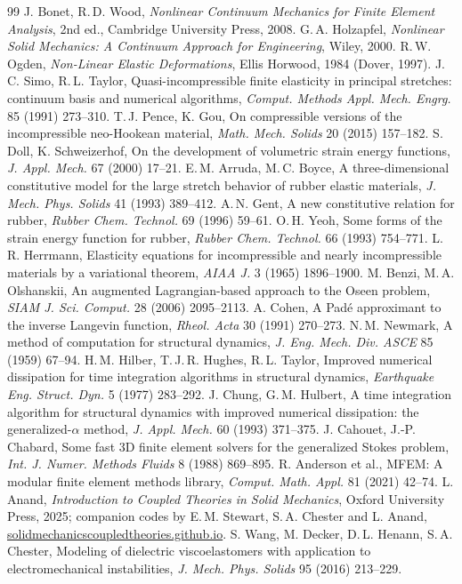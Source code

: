 \documentclass[11pt]{article}
\begin{document}
\small\begin{thebibliography}{99}
 J. Bonet, R.\,D. Wood, \emph{Nonlinear Continuum Mechanics for Finite Element Analysis}, 2nd ed., Cambridge University Press, 2008.
 G.\,A. Holzapfel, \emph{Nonlinear Solid Mechanics: A Continuum Approach for Engineering}, Wiley, 2000.
 R.\,W. Ogden, \emph{Non-Linear Elastic Deformations}, Ellis Horwood, 1984 (Dover, 1997).
 J.\,C. Simo, R.\,L. Taylor, Quasi-incompressible finite elasticity in principal stretches: continuum basis and numerical algorithms, \emph{Comput. Methods Appl. Mech. Engrg.} 85 (1991) 273--310.
 T.\,J. Pence, K. Gou, On compressible versions of the incompressible neo-Hookean material, \emph{Math. Mech. Solids} 20 (2015) 157--182.
 S. Doll, K. Schweizerhof, On the development of volumetric strain energy functions, \emph{J. Appl. Mech.} 67 (2000) 17--21.
 E.\,M. Arruda, M.\,C. Boyce, A three-dimensional constitutive model for the large stretch behavior of rubber elastic materials, \emph{J. Mech. Phys. Solids} 41 (1993) 389--412.
 A.\,N. Gent, A new constitutive relation for rubber, \emph{Rubber Chem. Technol.} 69 (1996) 59--61.
 O.\,H. Yeoh, Some forms of the strain energy function for rubber, \emph{Rubber Chem. Technol.} 66 (1993) 754--771.
 L.\,R. Herrmann, Elasticity equations for incompressible and nearly incompressible materials by a variational theorem, \emph{AIAA J.} 3 (1965) 1896--1900.
 M. Benzi, M.\,A. Olshanskii, An augmented Lagrangian-based approach to the Oseen problem, \emph{SIAM J. Sci. Comput.} 28 (2006) 2095--2113.
 A. Cohen, A Pad\'e approximant to the inverse Langevin function, \emph{Rheol. Acta} 30 (1991) 270--273.
 N.\,M. Newmark, A method of computation for structural dynamics, \emph{J. Eng. Mech. Div. ASCE} 85 (1959) 67--94.
 H.\,M. Hilber, T.\,J.\,R. Hughes, R.\,L. Taylor, Improved numerical dissipation for time integration algorithms in structural dynamics, \emph{Earthquake Eng. Struct. Dyn.} 5 (1977) 283--292.
 J. Chung, G.\,M. Hulbert, A time integration algorithm for structural dynamics with improved numerical dissipation: the generalized-$\alpha$ method, \emph{J. Appl. Mech.} 60 (1993) 371--375.
 J. Cahouet, J.-P. Chabard, Some fast 3D finite element solvers for the generalized Stokes problem, \emph{Int. J. Numer. Methods Fluids} 8 (1988) 869--895.
 R. Anderson et al., MFEM: A modular finite element methods library, \emph{Comput. Math. Appl.} 81 (2021) 42--74.
 L. Anand, \emph{Introduction to Coupled Theories in Solid Mechanics}, Oxford University Press, 2025; companion codes by E.\,M. Stewart, S.\,A. Chester and L. Anand, \url{solidmechanicscoupledtheories.github.io}.
 S. Wang, M. Decker, D.\,L. Henann, S.\,A. Chester, Modeling of dielectric viscoelastomers with application to electromechanical instabilities, \emph{J. Mech. Phys. Solids} 95 (2016) 213--229.
\end{thebibliography}
\end{document}
